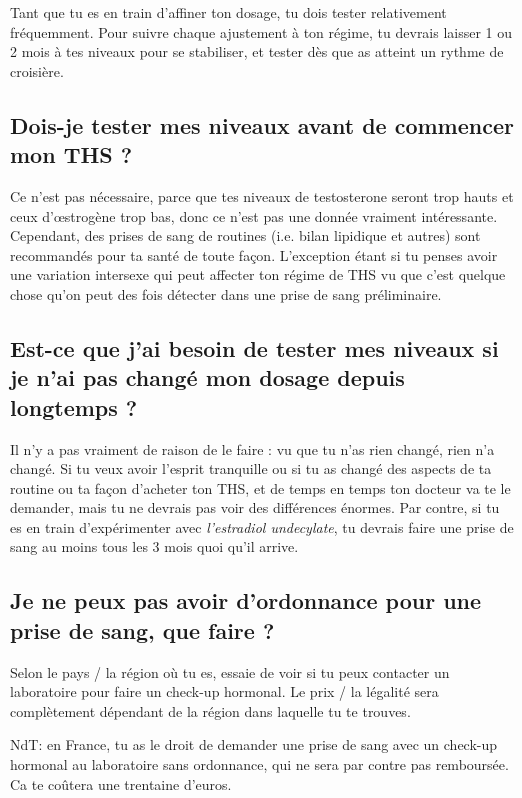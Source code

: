 \documentclass{article}
\begin{document}
Tant que tu es en train d'affiner ton dosage, tu dois tester relativement fréquemment. Pour suivre chaque ajustement à ton régime, tu devrais laisser 1 ou 2 mois à tes niveaux pour se stabiliser, et tester dès que as atteint un rythme de croisière.

\subsection{Dois-je tester mes niveaux avant de commencer mon THS ?}

Ce n'est pas nécessaire, parce que tes niveaux de testosterone seront trop hauts et ceux d'œstrogène trop bas, donc ce n'est pas une donnée vraiment intéressante. Cependant, des prises de sang de routines (i.e. bilan lipidique et autres) sont recommandés pour ta santé de toute façon. L'exception étant si tu penses avoir une variation intersexe qui peut affecter ton régime de THS vu que c'est quelque chose qu'on peut des fois détecter dans une prise de sang préliminaire.

\subsection{Est-ce que j'ai besoin de tester mes niveaux si je n'ai pas changé mon dosage depuis longtemps ?}

Il n'y a pas vraiment de raison de le faire : vu que tu n'as rien changé, rien n'a changé. Si tu veux avoir l'esprit tranquille ou si tu as changé des aspects de ta routine ou ta façon d'acheter ton THS, et de temps en temps ton docteur va te le demander, mais tu ne devrais pas voir des différences énormes. Par contre, si tu es en train d'expérimenter avec \textit{l'estradiol undecylate}, tu devrais faire une prise de sang au moins tous les 3 mois quoi qu'il arrive.

\subsection{Je ne peux pas avoir d'ordonnance pour une prise de sang, que faire ?}


Selon le pays / la région où tu es, essaie de voir si tu peux contacter un laboratoire pour faire un check-up hormonal. Le prix / la légalité sera complètement dépendant de la région dans laquelle tu te trouves.

NdT: en France, tu as le droit de demander une prise de sang avec un check-up hormonal au laboratoire sans ordonnance, qui ne sera par contre pas remboursée. Ca te coûtera une trentaine d'euros.
\end{document}
